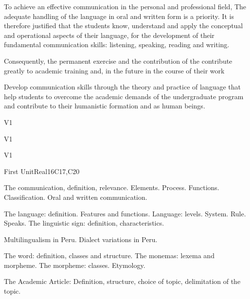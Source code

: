 \begin{syllabus}


\begin{justification}
   To achieve an effective communication in the personal and professional field, 
   The adequate handling of the language in oral and written form is a priority. 
   It is therefore justified that the students know, understand and apply 
   the conceptual and operational aspects of their language, for the development 
   of their fundamental communication skills: listening, speaking, reading and writing.

   Consequently, the permanent exercise and the contribution of the contribute greatly 
   to academic training and, in the future in the course of their work
\end{justification}

\begin{goals}
\item Develop communication skills through the theory and practice of language that help students to overcome the academic demands of the undergraduate program and contribute to their humanistic formation and as human beings.
\end{goals}

\begin{outcomes}{V1}
    \item {}
    \item {}
\end{outcomes}

\begin{specificoutcomes}{V1}
   \item {}
   \item {}
\end{specificoutcomes}

\begin{competences}{V1}
    \item {}
\end{competences}

\begin{unit}{}{First Unit}{Real}{16}{C17,C20}
\begin{topics}
      \item The communication, definition, relevance. Elements. Process. Functions. Classification. Oral and written communication.
      \item The language: definition. Features and functions. Language: levels. System. Rule. Speaks. The linguistic sign: definition, characteristics.
      \item Multilingualism in Peru. Dialect variations in Peru.
      \item The word: definition, classes and structure. The monemas: lexema and morpheme. The morpheme: classes. Etymology.
      \item The Academic Article: Definition, structure, choice of topic, delimitation of the topic.
\end{topics}


\end{unit}
\end{syllabus}
